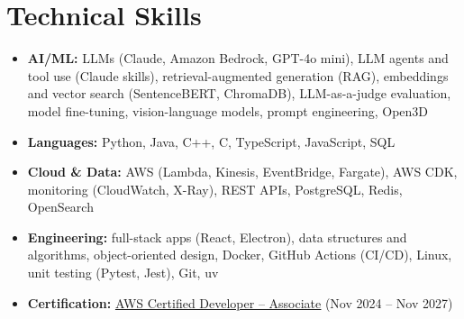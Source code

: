 \documentclass[letterpaper,10pt]{article}
\begin{document}
\section{Technical Skills}
\begin{itemize}[leftmargin=0in, label={}, itemsep=0pt, topsep=2pt]
  \small
  \item{\textbf{AI/ML:} LLMs (Claude, Amazon Bedrock, GPT-4o mini), LLM agents and tool use (Claude skills), retrieval-augmented generation (RAG), embeddings and vector search (SentenceBERT, ChromaDB), LLM-as-a-judge evaluation, model fine-tuning, vision-language models, prompt engineering, Open3D}
  \item{\textbf{Languages:} Python, Java, C++, C, TypeScript, JavaScript, SQL}
  \item{\textbf{Cloud \& Data:} AWS (Lambda, Kinesis, EventBridge, Fargate), AWS CDK, monitoring (CloudWatch, X-Ray), REST APIs, PostgreSQL, Redis, OpenSearch}
  \item{\textbf{Engineering:} full-stack apps (React, Electron), data structures and algorithms, object-oriented design, Docker, GitHub Actions (CI/CD), Linux, unit testing (Pytest, Jest), Git, uv}
  \item{\textbf{Certification:} \href{https://www.credly.com/badges/d2406a97-d937-47de-823b-724981159d3b/public_url}{\underline{AWS Certified Developer -- Associate}} (Nov 2024 -- Nov 2027)}
\end{itemize}
\end{document}
